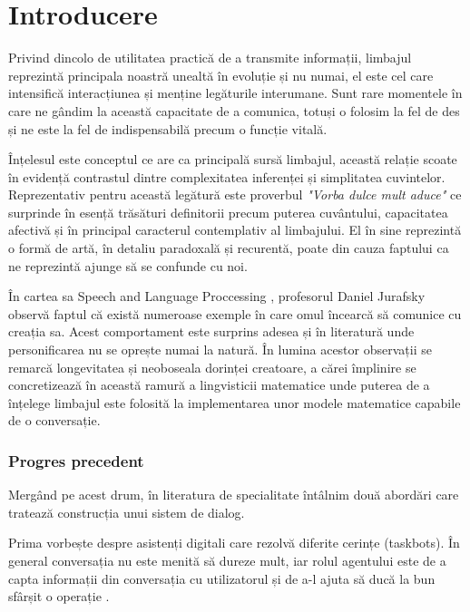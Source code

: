 \chapter{Introducere}


Privind dincolo de utilitatea practică de a transmite informații, limbajul reprezintă principala noastră unealtă în evoluție și nu numai, el este cel care intensifică interacțiunea și menține legăturile interumane. Sunt rare momentele în care ne gândim la această capacitate de a comunica, totuși o folosim la fel de des și ne este la fel de indispensabilă precum o funcție vitală.

Înțelesul este conceptul ce are ca principală sursă limbajul, această relație scoate în evidență contrastul dintre complexitatea inferenței și simplitatea cuvintelor. Reprezentativ pentru această legătură este proverbul \textit{"Vorba dulce mult aduce"} ce surprinde în esență trăsături definitorii precum puterea cuvântului, capacitatea afectivă și în principal caracterul contemplativ al limbajului. El în sine reprezintă o formă de artă, în detaliu paradoxală și recurentă, poate din cauza faptului ca ne reprezintă ajunge să se confunde cu noi.

În cartea sa Speech and Language Proccessing \cite{speach__lang_processing}, profesorul Daniel Jurafsky observă faptul că există numeroase exemple în care omul încearcă să comunice cu creația sa. Acest comportament este surprins adesea și în literatură unde personificarea nu se oprește numai la natură. În lumina acestor observații se remarcă longevitatea și neoboseala dorinței creatoare, a cărei împlinire se concretizează în această ramură a lingvisticii matematice unde puterea de a înțelege limbajul este folosită la implementarea unor modele matematice capabile de o conversație.

\subsection{Progres precedent}
Mergând pe acest drum, în literatura de specialitate întâlnim două abordări care tratează construcția unui sistem de dialog.

Prima vorbește despre asistenți digitali care rezolvă diferite cerințe (taskbots). În general conversația nu este menită să dureze mult, iar rolul agentului este de a capta informații din conversația cu utilizatorul și de a-l ajuta să ducă la bun sfârșit o operație \cite{joint_online_bing, att_joint_bing}.

